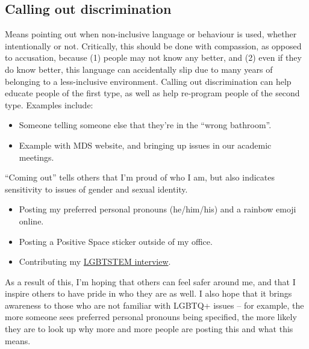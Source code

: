 \documentclass[]{book}
\providecommand{\tightlist}{%
  \setlength{\itemsep}{0pt}\setlength{\parskip}{0pt}}
\begin{document}
\hypertarget{calling-out-discrimination}{%
\subsection{Calling out discrimination}\label{calling-out-discrimination}}

Means pointing out when non-inclusive language or behaviour is used, whether intentionally or not. Critically, this should be done with compassion, as opposed to accusation, because (1) people may not know any better, and (2) even if they do know better, this language can accidentally slip due to many years of belonging to a less-inclusive environment. Calling out discrimination can help educate people of the first type, as well as help re-program people of the second type. Examples include:

\begin{itemize}
\tightlist
\item
  Someone telling someone else that they're in the ``wrong bathroom''.
\item
  Example with MDS website, and bringing up issues in our academic meetings.
\end{itemize}

``Coming out'' tells others that I'm proud of who I am, but also indicates sensitivity to issues of gender and sexual identity.

\begin{itemize}
\tightlist
\item
  Posting my preferred personal pronouns (he/him/his) and a rainbow emoji online.
\item
  Posting a Positive Space sticker outside of my office.
\item
  Contributing my \href{https://lgbtstem.wordpress.com/2019/11/09/an-interview-with-vincenzo-coia/}{LGBTSTEM interview}.
\end{itemize}

As a result of this, I'm hoping that others can feel safer around me, and that I inspire others to have pride in who they are as well. I also hope that it brings awareness to those who are not familiar with LGBTQ+ issues -- for example, the more someone sees preferred personal pronouns being specified, the more likely they are to look up why more and more people are posting this and what this means.
\end{document}

